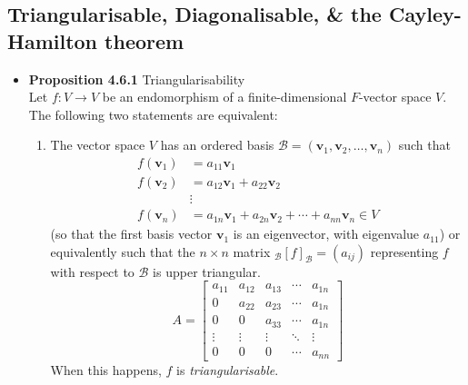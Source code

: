 \documentclass[11pt,a4paper]{article}
\begin{document}
\subsection{Triangularisable, Diagonalisable, \& the Cayley-Hamilton theorem}

\begin{itemize}
    \item \textbf{Proposition 4.6.1} Triangularisability \\
        Let $f : V \to V$ be an endomorphism of a finite-dimensional $F$-vector space $V$.
        The following two statements are equivalent:
        \begin{enumerate}
            \item The vector space $V$ has an ordered basis
                $\mathcal{B} = (\textbf{v}_1, \textbf{v}_2, \ldots, \textbf{v}_n)$ such that
                \begin{align*}{}
                    f(\textbf{v}_1) &= a_{11}\textbf{v}_1 \\
                    f(\textbf{v}_2) &= a_{12}\textbf{v}_1 + a_{22}\textbf{v}_2 \\
                                    &\vdots \\
                    f(\textbf{v}_n) &= a_{1n}\textbf{v}_1 + a_{2n}\textbf{v}_2 + \cdots +
                    a_{nn}\textbf{v}_n \in V
                \end{align*}
                (so that the first basis vector $\textbf{v}_1$ is an eigenvector,
                with eigenvalue $a_{11}$) or equivalently such that the $n \times n$ matrix
                $_\mathcal{B}{[f]}_\mathcal{B} = (a_{ij})$ representing $f$ with respect to
                $\mathcal{B}$ is upper triangular.
                \[
                    A =
                    \begin{bmatrix}{}
                        a_{11} & a_{12} & a_{13} & \cdots & a_{1n} \\
                        0      & a_{22} & a_{23} & \cdots & a_{1n} \\
                        0      & 0      & a_{33} & \cdots & a_{1n} \\
                        \vdots & \vdots & \vdots & \ddots & \vdots \\
                        0      & 0      & 0      & \cdots & a_{nn}
                    \end{bmatrix}
                \]
                When this happens, $f$ is \emph{triangularisable}.


\end{enumerate}
\end{itemize}
\end{document}
